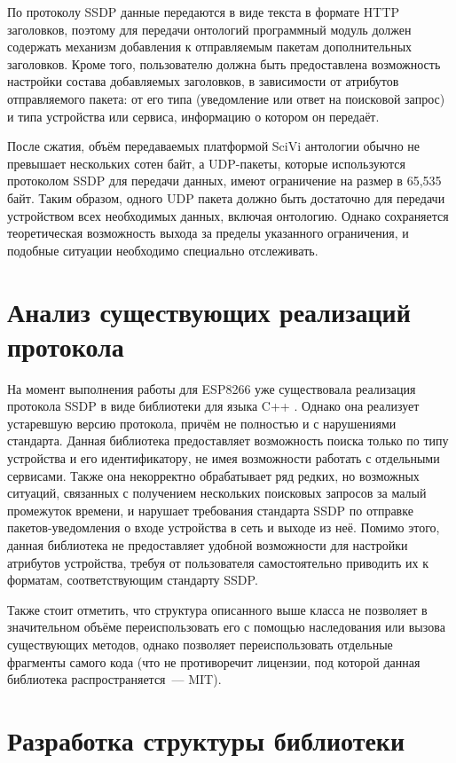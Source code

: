 По протоколу SSDP данные передаются в виде текста в формате HTTP заголовков, поэтому для передачи онтологий программный модуль должен содержать механизм добавления к отправляемым пакетам дополнительных заголовков.
Кроме того, пользователю должна быть предоставлена возможность настройки состава добавляемых заголовков, в зависимости от атрибутов отправляемого пакета: от его типа (уведомление или ответ на поисковой запрос) и типа устройства или сервиса, информацию о котором он передаёт.

После сжатия, объём передаваемых платформой SciVi антологии обычно не превышает нескольких сотен байт, а UDP-пакеты, которые используются протоколом SSDP для передачи данных, имеют ограничение на размер в 65,535 байт.
Таким образом, одного UDP пакета должно быть достаточно для передачи устройством всех необходимых данных, включая онтологию.
Однако сохраняется теоретическая возможность выхода за пределы указанного ограничения, и подобные ситуации необходимо специально отслеживать.

\section{Анализ существующих реализаций протокола}

На момент выполнения работы для ESP8266 уже существовала реализация протокола SSDP в виде библиотеки для языка C++ \cite{web:esp-ssdp}.
Однако она реализует устаревшую версию протокола, причём не полностью и с нарушениями стандарта.
Данная библиотека предоставляет возможность поиска только по типу устройства и его идентификатору, не имея возможности работать с отдельными сервисами.
Также она некорректно обрабатывает ряд редких, но возможных ситуаций, связанных с получением нескольких поисковых запросов за малый промежуток времени, и нарушает требования стандарта SSDP по отправке пакетов-уведомления о входе устройства в сеть и выходе из неё.
Помимо этого, данная библиотека не предоставляет удобной возможности для настройки атрибутов устройства, требуя от пользователя самостоятельно приводить их к форматам, соответствующим стандарту SSDP.

Также стоит отметить, что структура описанного выше класса не позволяет в значительном объёме переиспользовать его с помощью наследования или вызова существующих методов, однако позволяет переиспользовать отдельные фрагменты самого кода (что не противоречит лицензии, под которой данная библиотека распространяется~--- MIT).

\section{Разработка структуры библиотеки}

